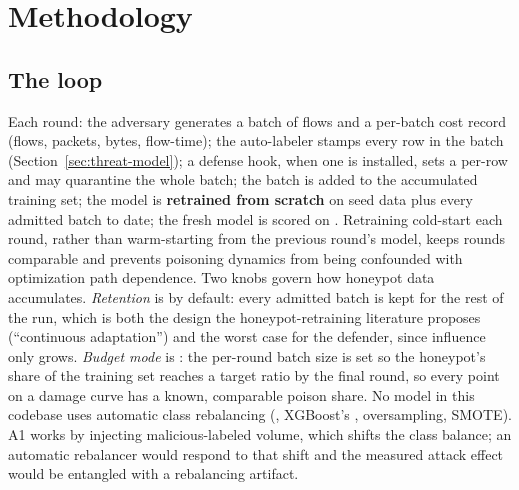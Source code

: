 \section{Methodology}
\label{sec:methodology}

\subsection{The loop}
Each round: the adversary generates a batch of flows and a per-batch cost record (flows,
packets, bytes, flow-time); the auto-labeler stamps every row in the batch (Section~\ref{sec:threat-model});
a defense hook, when one is installed, sets a per-row  and may quarantine
the whole batch; the batch is added to the accumulated training set; the model is
\textbf{retrained from scratch} on seed data plus every admitted batch to date; the fresh model
is scored on . Retraining cold-start each round, rather than warm-starting
from the previous round's model, keeps rounds comparable and prevents poisoning dynamics from
being confounded with optimization path dependence.
Two knobs govern how honeypot data accumulates. \emph{Retention} is  by
default: every admitted batch is kept for the rest of the run, which is both the design the
honeypot-retraining literature proposes (“continuous adaptation”) and the worst case for the
defender, since influence only grows. \emph{Budget mode} is : the
per-round batch size is set so the honeypot's share of the training set reaches a target ratio
by the final round, so every point on a damage curve has a known, comparable poison share.
No model in this codebase uses automatic class rebalancing (,
XGBoost's , oversampling, SMOTE). A1 works by injecting
malicious-labeled volume, which shifts the class balance; an automatic rebalancer would respond
to that shift and the measured attack effect would be entangled with a rebalancing artifact.
